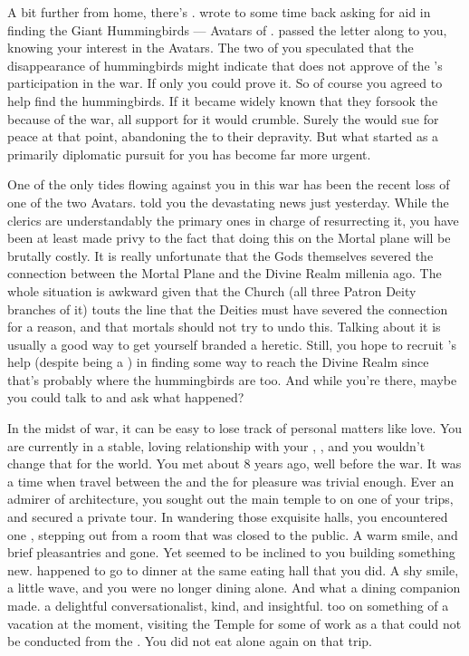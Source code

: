 \documentclass[char]{GL2020}
\begin{document}
A bit further from home, there's \cDisney{\intro}. \cDisney{\They} wrote to \cHeadDiplomat{} some time back asking for aid in finding the Giant Hummingbirds — Avatars of \cFarmGod{\intro}. \cHeadDiplomat{} passed the letter along to you, knowing your interest in the Avatars. The two of you speculated that the disappearance of hummingbirds might indicate that \cFarmGod{} does not approve of the \pFarm{}’s participation in the war. If only you could prove it. So of course you agreed to help \cDisney{} find the hummingbirds. If it became widely known that they forsook the \pFarm{} because of the war, all support for it would crumble. Surely the \pFarm{} would sue for peace at that point, abandoning the \pTech{} to their depravity. But what started as a primarily diplomatic pursuit for you has become far more urgent.

One of the only tides flowing against you in this war has been the recent loss of one of the two \pShip{} Avatars. \cEbbPriest{} told you the devastating news just yesterday. While the clerics are understandably the primary ones in charge of resurrecting it, you have been at least made privy to the fact that doing this on the Mortal plane will be brutally costly. It is really unfortunate that the Gods themselves severed the connection between the Mortal Plane and the Divine Realm millenia ago. The whole situation is awkward given that the Church (all three Patron Deity branches of it) touts the line that the Deities must have severed the connection for a reason, and that mortals should not try to undo this. Talking about it is usually a good way to get yourself branded a heretic. Still, you hope to recruit \cDisney{}’s help (despite \cDisney{\them} being a \cDisney{\cleric}) in finding some way to reach the Divine Realm since that’s probably where the hummingbirds are too. And while you’re there, maybe you could talk to \cFarmGod{} and ask what happened?

In the midst of war, it can be easy to lose track of personal matters like love. You are currently in a stable, loving relationship with your \cBeetle{\partner}, \cBeetle{\intro}, and you wouldn't change that for the world. You met about 8 years ago, well before the war. It was a time when travel between the \pTech{} and the \pShip{} for pleasure was trivial enough. Ever an admirer of architecture, you sought out the main temple to \cTechGod{\intro} on one of your trips, and secured a private tour. In wandering those exquisite halls, you encountered one \cBeetle{}, stepping out from a room that was closed to the public. A warm smile, and brief pleasantries and \cBeetle{\theywere} gone. Yet \cFlow{} seemed to be inclined to you building something new. \cBeetle{} happened to go to dinner at the same eating hall that you did. A shy smile, a little wave, and you were no longer dining alone. And what a dining companion \cBeetle{} made. \cBeetle{\Theyare} a delightful conversationalist, kind, and insightful. \cBeetle{\They} too \cBeetle{\were} on something of a vacation at the moment, visiting the Temple for some of \cBeetle{\their} work as a \cBeetle{\cleric} that could not be conducted from the \pSchool{}. You did not eat alone again on that trip.
\end{document}
